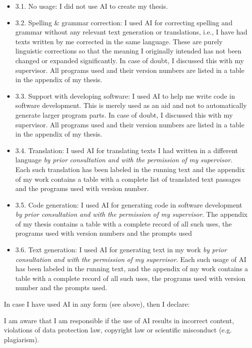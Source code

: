 \begin{itemize}
    \item[\checkboxUnchecked] 3.1. No usage: I did not use AI to create my thesis.
    \item[\checkboxUnchecked] 3.2. Spelling \& grammar correction: I used AI for correcting spelling and grammar without any relevant text generation or translations, i.e., I have had texts written by me corrected in the same language. These are purely linguistic corrections so that the meaning I originally intended has not been changed or expanded significantly. In case of doubt, I discussed this with my supervisor. All programs used and their version numbers are listed in a table in the appendix of my thesis.
    \item[\checkboxUnchecked] 3.3. Support with developing software: I used AI to help me write code in software development. This is merely used as an aid and not to automatically generate larger program parts. In case of doubt, I discussed this with my supervisor. All programs used and their version numbers are listed in a table in the appendix of my thesis.
    \item[\checkboxUnchecked] 3.4. Translation: I used AI for translating texts I had written in a different language \textit{by prior consultation and with the permission of my supervisor}. Each such translation has been labeled in the running text and the appendix of my work contains a table with a complete list of translated text passages and the programs used with version number.
    \item[\checkboxUnchecked] 3.5. Code generation: I used AI for generating code in software development \textit{by prior consultation and with the permission of my supervisor}. The appendix of my thesis contains a table with a complete record of all such uses, the programs used with version numbers and the prompts used
    \item[\checkboxUnchecked] 3.6. Text generation: I used AI for generating text in my work \textit{by prior consultation and with the permission of my supervisor}. Each such usage of AI has been labeled in the running text, and the appendix of my work contains a table with a complete record of all such uses, the programs used with version number and the prompts used.
\end{itemize}

In case I have used AI in any form (see above), then I declare:

I am aware that I am responsible if the use of AI results in incorrect content, violations of data protection law, copyright law or scientific misconduct (e.g. plagiarism).

